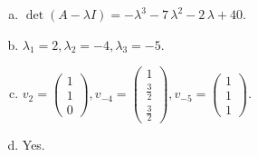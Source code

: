 \begin{questions}
\begin{solution}
\begin{enumerate}[(a)]
\item $\det(A-\lambda I)=-{\lambda}^{3} - 7 \, {\lambda}^{2} - 2 \, {\lambda} + 40$.
\item ${\lambda}_1=2, {\lambda}_2=-4, {\lambda}_3=-5$.
\item $v_{2}=\left(\begin{array}{r}
1 \\
1 \\
0
\end{array}\right), v_{-4}=\left(\begin{array}{r}
1 \\
\frac{3}{2} \\
\frac{3}{2}
\end{array}\right), v_{-5}=\left(\begin{array}{r}
1 \\
1 \\
1
\end{array}\right)$.
\item Yes.
\end{enumerate}
\end{solution}

\end{questions}

\newpage


\begin{center}
\end{center}

